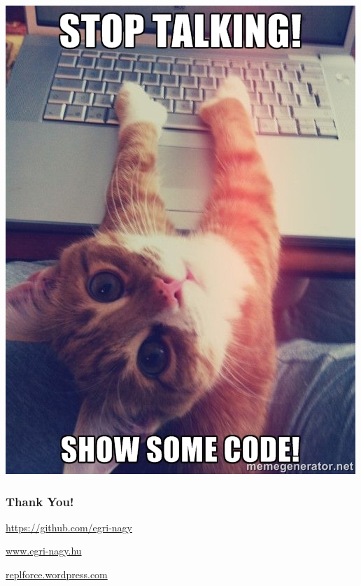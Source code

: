\documentclass{beamer}
\begin{document}
\begin{frame}%
\includegraphics[height=\textheight]{ProgrammerCat.jpg}
\end{frame}

\begin{frame}\frametitle{Thank You!}
\begin{center}
\huge
\url{https://github.com/egri-nagy}

\url{www.egri-nagy.hu}

\url{replforce.wordpress.com}

\end{center}
\end{frame}
\end{document}
